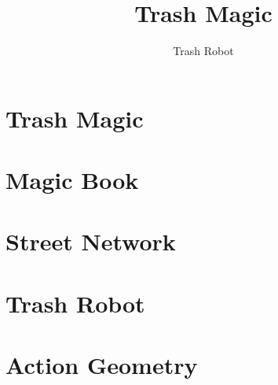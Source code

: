 \documentclass[ebook,12pt,openany,onesided]{memoir} %
\title{Trash Magic}
\author{Trash Robot}
\begin{document}
\frontmatter

\clearpage

\clearpage

\newpage
\thispagestyle{empty}
\mbox{}

\maketitle



%

\mainmatter

\chapter{Trash Magic}

\chapter{Magic Book}

\chapter{Street Network}

\chapter{Trash Robot}

\chapter{Action Geometry}




\end{document}
